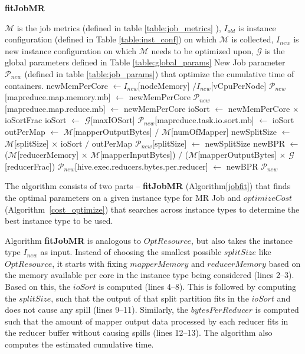 \begin{algorithm}
	\caption{\textbf{fitJobMR}}\label{jobfit}
	\begin{algorithmic}[1]
		\footnotesize
		\REQUIRE  $\mathcal{M}$ is the job metrics (defined in table \ref{table:job_metrics} ), $I_{old}$  is instance configuration (defined in Table \ref{table:inst_conf}) on which $\mathcal{M}$ is collected, $I_{new}$ is new instance configuration on which $\mathcal{M}$ needs to be optimized upon, $\mathcal{G}$ is the global parameters defined in Table \ref{table:global_params}
		\ENSURE New Job parameter $\mathcal{P}_{new}$ (defined in table \ref{table:job_params}) that optimize the cumulative time of containers.
		\STATE newMemPerCore $\gets I_{new}$[nodeMemory] $/ I_{new}$[vCpuPerNode]
		\STATE $\mathcal{P}_{new}$[mapreduce.map.memory.mb] $\gets$ newMemPerCore
		\STATE $\mathcal{P}_{new}$[mapreduce.map.reduce.mb] $\gets$ newMemPerCore
		\STATE ioSort $\gets$ newMemPerCore $\times$ ioSortFrac
		\STATE ioSort $\gets$ $\mathcal{G}$[maxIOSort]
		\ENDIF
		\STATE $\mathcal{P}_{new}$[mapreduce.task.io.sort.mb] $\gets$ ioSort
		\STATE outPerMap $\gets$ $\mathcal{M}$[mapperOutputBytes] $/$ $\mathcal{M}$[numOfMapper]
		\STATE newSplitSize $\gets$ $\mathcal{M}$[splitSize] $\times$ ioSort $/$ outPerMap
		\STATE $\mathcal{P}_{new}$[splitSize] $\gets$ newSplitSize
		\STATE newBPR $\gets$ ($\mathcal{M}$[reducerMemory] $\times$ $\mathcal{M}$[mapperInputBytes]) $/$ ($\mathcal{M}$[mapperOutputBytes] $\times$ $\mathcal{G}$[reducerFrac])  
		\STATE $\mathcal{P}_{new}$[hive.exec.reducers.bytes.per.reducer] $\gets$ newBPR
		\STATE \RETURN $\mathcal{P}_{new}$
	\end{algorithmic}
\end{algorithm}

The algorithm consists of two parts -- \textbf{fitJobMR} (Algorithm\ref{jobfit}) that finds the optimal parameters on a given instance type for MR Job and $optimizeCost$ (Algorithm~\ref{cost_optimize}) that searches across instance types to determine the best instance type to be used. 

Algorithm \textbf{fitJobMR} is analogous to $OptResource$, but also takes the instance type $I_{new}$ as input. Instead of choosing the smallest possible $splitSize$ like $OptResource$, it starts with fixing $mapperMemory$ and $reducerMemory$ based on the memory available per core in the instance type being considered (lines 2--3). Based on this, the $ioSort$ is computed (lines 4--8). This is followed by computing the $splitSize$, such that the output of that split partition fits in the $ioSort$ and does not cause any spill (lines 9--11). Similarly, the $bytesPerReducer$ is computed such that the amount of mapper output data processed by each reducer fits in the reducer buffer without causing spills (lines 12--13). The algorithm also computes the estimated cumulative time.

